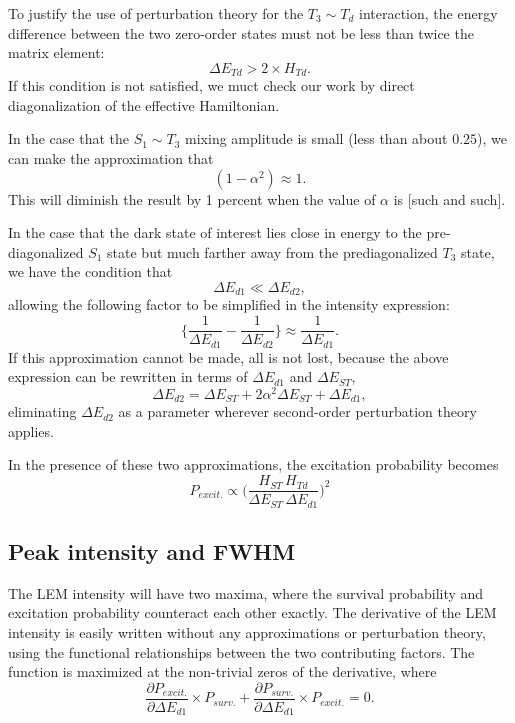 \documentclass{article}
\begin{document}
To justify the use of perturbation theory for the $T_3 \sim T_d$
interaction, the energy difference between the two zero-order states
must not be less than twice the matrix element:
\begin{equation}
\Delta E_{Td} > 2 \times H_{Td} .
\end{equation}
If this condition is not satisfied, we muct check our work by direct
diagonalization of the effective Hamiltonian.

In the case that the $S_1 \sim T_3$ mixing amplitude is small (less
than about $0.25$), we can make the approximation that
\begin{equation}
(1 - \alpha^2) \approx 1 .
\end{equation}
This will diminish the result by 1 percent when the value of
$\alpha$ is [such and such].

In the case that the dark state of interest lies close in energy to
the pre-diagonalized $S_1$ state but much farther away from the
prediagonalized $T_3$ state, we have the condition that
\begin{equation}
\Delta E_{d1} \ll \Delta E_{d2} ,
\end{equation}
allowing the following factor to be simplified in the intensity
expression:
\begin{equation}
  \biggl\lbrace 
  \frac{1}{\Delta E_{d1}} - \frac{1}{\Delta E_{d2}} 
  \biggr\rbrace
  \approx \frac{1}{\Delta E_{d1}} .
\end{equation}
If this approximation cannot be made, all is not lost, because the
above expression can be rewritten in terms of $\Delta E_{d1}$ and
$\Delta E_{ST}$,
\begin{equation}
  \Delta E_{d2} = \Delta E_{ST} + 2 \alpha^2 \Delta E_{ST} + \Delta
  E_{d1} ,
\end{equation}
eliminating $\Delta E_{d2}$ as a parameter wherever second-order
perturbation theory applies.

In the presence of these two approximations, the excitation
probability becomes
\begin{equation}
  P_{excit.} \propto
  \biggl(
  \frac{H_{ST} \, H_{Td}}{\Delta E_{ST} \, \Delta E_{d1} }
  \biggr)^2
\end{equation}

\subsection{Peak intensity and FWHM}

The LEM intensity will have two maxima, where the survival probability
and excitation probability counteract each other exactly. The
derivative of the LEM intensity is easily written without any
approximations or perturbation theory, using the functional
relationships between the two contributing factors. The function is
maximized at the non-trivial zeros of the derivative, where
\begin{equation}
  \frac{\partial P_{excit.}}{\partial \Delta E_{d1}} \times P_{surv.} +
  \frac{\partial P_{surv.}}{\partial \Delta E_{d1}} \times P_{excit.}
  = 0 .
\end{equation}
\end{document}
